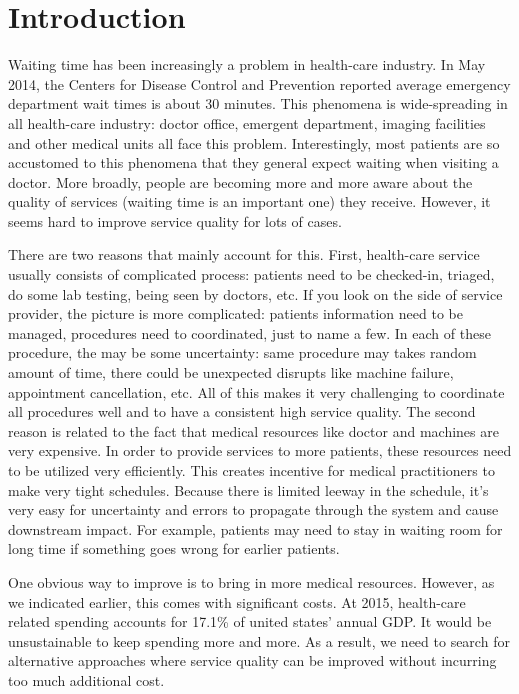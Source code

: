 \section{Introduction}

Waiting time has been increasingly a problem in health-care industry. In May 2014, the Centers for Disease Control and Prevention reported average emergency department wait times is about 30 minutes. This phenomena is wide-spreading in all health-care industry: doctor office, emergent department, imaging facilities and other medical units all face this problem. Interestingly, most patients are so accustomed to this phenomena that they general expect waiting when visiting a doctor. More broadly, people are becoming more and more aware about the quality of services (waiting time is an important one) they receive. However, it seems hard to improve service quality for lots of cases.

There are two reasons that mainly account for this. First, health-care service usually consists of complicated process: patients need to be checked-in, triaged, do some lab testing, being seen by doctors, etc. If you look on the side of service provider, the picture is more complicated: patients information need to be managed, procedures need to coordinated, just to name a few. In each of these procedure, the may be some uncertainty: same procedure may takes random amount of time, there could be unexpected disrupts like machine failure, appointment cancellation, etc. All of this makes it very challenging to coordinate all procedures well and to have a consistent high service quality. The second reason is related to the fact that medical resources like doctor and machines are very expensive. In order to provide services to more patients, these resources need to be utilized very efficiently. This creates incentive for medical practitioners to make very tight schedules. Because there is limited leeway in the schedule, it's very easy for uncertainty and errors to propagate through the system and cause downstream impact. For example, patients may need to stay in waiting room for long time if something goes wrong for earlier patients.

One obvious way to improve is to bring in more medical resources. However, as we indicated earlier, this comes with significant costs. At 2015, health-care related spending accounts for 17.1\% of united states' annual GDP. It would be unsustainable to keep spending more and more. As a result, we need to search for alternative approaches where service quality can be improved without incurring too much additional cost.

